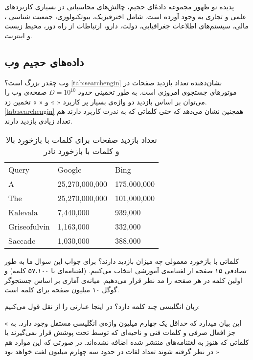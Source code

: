 پدیده نو ظهور مجموعه‌ داده‌ّای حجیم، چالش‌های محاسباتی در بسیاری کاربردهای علمی و تجاری به وجود آورده است. شامل اخترفیزیک، بیوتکنولوزی، جمعیت شناسی%
، مالی، سیستم‌های اطلاعات جغرافیایی، دولت، دارو، ارتباطات از راه دور، محیط زیست و اینترنت.

\subsection{داده‌های حجیم وب}

وب چقدر بزرگ است؟  
\autoref{tab:searchengin}
نشان‌دهنده تعداد بازدید صفحات در موتورهای جستجوی امروزی است. به طور تخمینی حدود 
$D = 10^10$
صفحه‌ی وب را می‌توان بر اساس بازدید دو واژه‌ی بسیار پر کاربرد «
» و «
» تخمین زد. 
\autoref{tab:searchengin}
 همچنین نشان می‌دهد که حتی کلماتی که به ندرت کاربرد دارند هم تعداد زیادی بازدید دارند.

\begin{table}[h]
\caption{
تعداد بازدید صفحات برای کلمات با بازخورد بالا و کلمات با بازخورد نادر
}
\centering
\bigskip
\begin{latin}
\begin{tabular}{lll}
\hline
Query        & Google         & Bing        \\ \hhline{===}
A            & 25,270,000,000 & 175,000,000 \\
The          & 25,270,000,000 & 101,000,000 \\
Kalevala     & 7,440,000      & 939,000     \\
Griseofulvin & 1,163,000      & 332,000     \\
Saccade      & 1,030,000      & 388,000     \\
\hline
\end{tabular}
\end{latin}
\label{tab:searchengin}
\end{table}


کلماتی با بازخورد معمولی چه میزان بازدید دارند؟ برای جواب این سوال ما به طور تصادفی ۱۵ صفحه از لغتنامه‌‌ی آموزشی انتخاب می‌کنیم.
\cite{litez94}
(لغتنامه‌ای با ۵۷،۱۰۰ کلمه) و اولین کلمه در هر صفحه را مد نظر قرار می‌دهیم. میانه‌ی آماری بر اساس جستجو‌گر گوگل ۱۰ میلیون صفحه برای کلمه است.

زبان انگلیسی چند کلمه دارد؟ در اینجا عبارتی را از 
نقل قول می‌کنیم:

« این بیان میدارد که حداقل یک چهارم میلیون واژه‌ی انگلیسی مستقل وجود دارد. به جز افعال صرفی و کلمات فنی و ناحیه‌ای که توسط 
%
تحت پوشش قرار نمی‌گیرند یا کلماتی که هنوز به لغتنامه‌های منتشر شده اضافه نشده‌اند. در صورتی که این موارد هم در نظر گرفته شوند تعداد لغات در حدود سه چهارم میلیون لغت خواهد بود »

